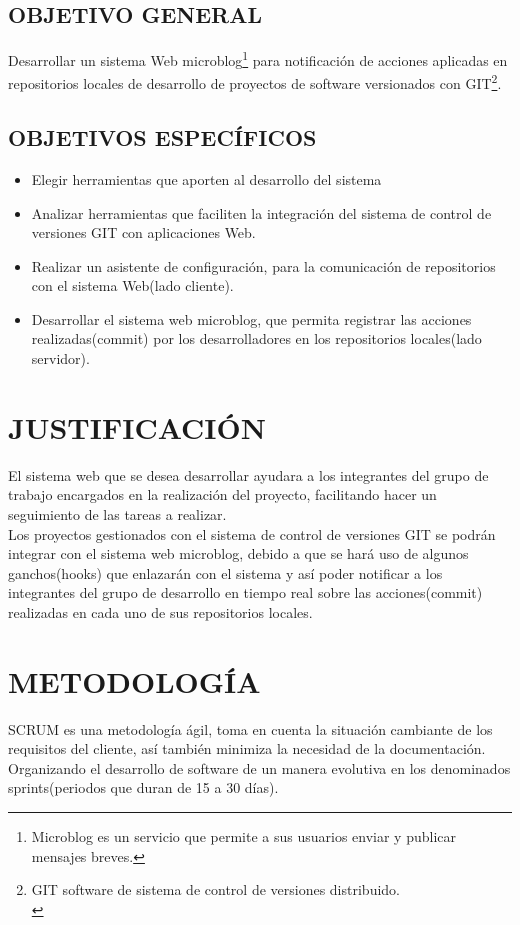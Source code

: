 \subsection{OBJETIVO GENERAL}
Desarrollar un sistema Web microblog\footnote{Microblog es un servicio que permite a sus usuarios enviar y publicar mensajes breves.
} para notificación de acciones aplicadas en repositorios locales de desarrollo de proyectos de software versionados con GIT\footnote{GIT software de sistema de control de versiones distribuido.\\
}.

\subsection{OBJETIVOS ESPECÍFICOS}
\begin{itemize}
\item Elegir herramientas que aporten al desarrollo del sistema
\item Analizar herramientas que faciliten la integración del sistema de control de versiones GIT con aplicaciones Web.
\item Realizar un asistente de configuración, para la comunicación de 	repositorios con el sistema Web(lado cliente).
\item Desarrollar el sistema web microblog, que permita registrar las acciones realizadas(commit) por los desarrolladores en los repositorios locales(lado servidor).
\end{itemize}

\section{JUSTIFICACIÓN}
El sistema web que se desea desarrollar ayudara  a los integrantes del grupo de trabajo encargados en la realización del proyecto, facilitando hacer un seguimiento de las tareas a realizar.\\

Los proyectos gestionados con el sistema de control de versiones GIT se podrán integrar con el sistema web microblog, debido a que se hará uso de algunos ganchos(hooks) que enlazarán con el sistema y así poder notificar a los integrantes del grupo de desarrollo en tiempo real sobre las acciones(commit) realizadas en cada uno de sus repositorios locales.\\

\section{METODOLOGÍA}
SCRUM es una metodología ágil, toma en cuenta la situación cambiante de los requisitos del cliente, así también minimiza la necesidad de la documentación.
Organizando el desarrollo de software de un manera evolutiva en los denominados sprints(periodos que duran de 15 a 30 días).

